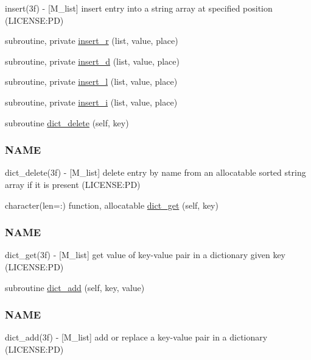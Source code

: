 \begin{DoxyCompactItemize}
\begin{DoxyCompactList}
insert(3f) -\/ \mbox{[}M\+\_\+list\mbox{]} insert entry into a string array at specified position (L\+I\+C\+E\+N\+SE\+:PD) \end{DoxyCompactList}\item 
subroutine, private \mbox{\hyperlink{namespacem__list_affd8a9996750ccf655cf677136d9fc4e}{insert\+\_\+r}} (list, value, place)
\item 
subroutine, private \mbox{\hyperlink{namespacem__list_ae2356cb1ec5b313c3fcbad090d6eb440}{insert\+\_\+d}} (list, value, place)
\item 
subroutine, private \mbox{\hyperlink{namespacem__list_a6108584670ced9dc4469e76ceb808730}{insert\+\_\+l}} (list, value, place)
\item 
subroutine, private \mbox{\hyperlink{namespacem__list_a7d50f88bd8d25138af4e6d484aca2cbc}{insert\+\_\+i}} (list, value, place)
\item 
subroutine \mbox{\hyperlink{namespacem__list_aa562d18ce6890a8a1a96d77ff1d39948}{dict\+\_\+delete}} (self, key)
\begin{DoxyCompactList}\small\item\em \subsubsection*{N\+A\+ME}

dict\+\_\+delete(3f) -\/ \mbox{[}M\+\_\+list\mbox{]} delete entry by name from an allocatable sorted string array if it is present (L\+I\+C\+E\+N\+SE\+:PD) \end{DoxyCompactList}\item 
character(len=\+:) function, allocatable \mbox{\hyperlink{namespacem__list_a7b9bb0b8fa4b0eeef45d7fcdc21f8bf3}{dict\+\_\+get}} (self, key)
\begin{DoxyCompactList}\small\item\em \subsubsection*{N\+A\+ME}

dict\+\_\+get(3f) -\/ \mbox{[}M\+\_\+list\mbox{]} get value of key-\/value pair in a dictionary given key (L\+I\+C\+E\+N\+SE\+:PD) \end{DoxyCompactList}\item 
subroutine \mbox{\hyperlink{namespacem__list_aca66691fd75ea79859a1b4505d2125bb}{dict\+\_\+add}} (self, key, value)
\begin{DoxyCompactList}\small\item\em \subsubsection*{N\+A\+ME}

dict\+\_\+add(3f) -\/ \mbox{[}M\+\_\+list\mbox{]} add or replace a key-\/value pair in a dictionary (L\+I\+C\+E\+N\+SE\+:PD) \end{DoxyCompactList}\end{DoxyCompactItemize}
